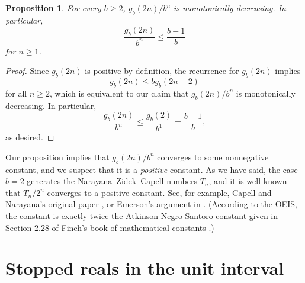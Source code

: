 \documentclass[12pt]{amsart}
\newcommand{\Z}{\mathbb{Z}}
\newtheorem{proposition}{Proposition}
\theoremstyle{definition}
\begin{document}
\begin{proposition}
    For every $b \geq 2$, $g_b(2n) / b^n$ is monotonically decreasing. In
    particular,
    \begin{equation*}
        \frac{g_b(2n)}{b^n} \leq \frac{b - 1}{b}
    \end{equation*}
    for $n \geq 1$.
\end{proposition}

\begin{proof}
    Since $g_b(2n)$ is positive by definition, the recurrence for $g_b(2n)$
    implies
    \begin{equation*}
        g_b(2n) \leq b g_b(2n - 2)
    \end{equation*}
    for all $n \geq 2$, which is equivalent to our claim that $g_b(2n) / b^n$
    is monotonically decreasing. In particular,
    \begin{equation*}
        \frac{g_b(2n)}{b^n} \leq \frac{g_b(2)}{b^1} = \frac{b - 1}{b},
    \end{equation*}
    as desired.
\end{proof}

Our proposition implies that $g_b(2n) / b^n$ converges to some nonnegative
constant, and we suspect that it is a \emph{positive} constant. As we have
said, the case $b = 2$ generates the Narayana--Zidek--Capell numbers $T_n$,
and it is well-known that $T_n / 2^n$ converges to a positive constant. See,
for example, Capell and Narayana's original paper \cite{capell1970knock}, or
Emerson's argument in \cite{emerson2005family}. (According to the OEIS, the
constant is exactly twice the Atkinson-Negro-Santoro constant given in Section
2.28 of Finch's book of mathematical constants \cite{finch2003mathematical}.)

\section{Stopped reals in the unit interval}
\label{sec:reals}


\end{document}
